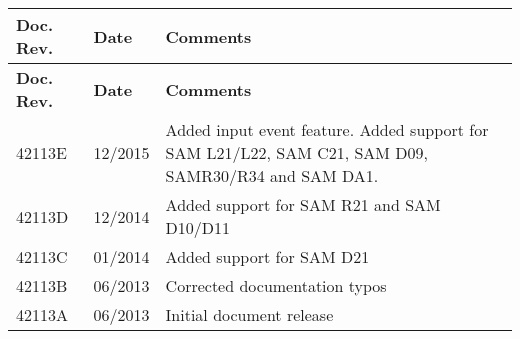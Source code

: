 \tabulinesep=1mm
\begin{longtabu}spread 0pt [c]{*{3}{|X[-1]}|}
\hline
\cellcolor{\tableheadbgcolor}\textbf{ Doc. Rev. }&\cellcolor{\tableheadbgcolor}\textbf{ Date }&\cellcolor{\tableheadbgcolor}\textbf{ Comments  }\\
\endfirsthead
\hline
\endfoot
\hline
\cellcolor{\tableheadbgcolor}\textbf{ Doc. Rev. }&\cellcolor{\tableheadbgcolor}\textbf{ Date }&\cellcolor{\tableheadbgcolor}\textbf{ Comments  }\\
\endhead
42113E &12/2015 &Added input event feature. Added support for SAM L21/\+L22, SAM C21, SAM D09, SAMR30/\+R34 and SAM DA1.  \\
42113D &12/2014 &Added support for SAM R21 and SAM D10/\+D11  \\
42113C &01/2014 &Added support for SAM D21  \\
42113B &06/2013 &Corrected documentation typos  \\
42113A &06/2013 &Initial document release  \\
\end{longtabu}

